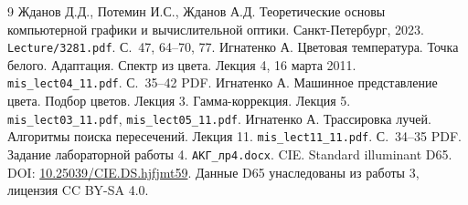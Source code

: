\documentclass[a4paper,12pt]{article}
\newcommand{\code}[1]{\nolinkurl{#1}}
\begin{document}
\begin{thebibliography}{9}
 Жданов Д.Д., Потемин И.С., Жданов А.Д. Теоретические основы компьютерной графики и вычислительной оптики. Санкт-Петербург, 2023. \code{Lecture/3281.pdf}. С.~47, 64--70, 77.
 Игнатенко А. Цветовая температура. Точка белого. Адаптация. Спектр из цвета. Лекция 4, 16 марта 2011. \code{mis_lect04_11.pdf}. С.~35--42 PDF.
 Игнатенко А. Машинное представление цвета. Подбор цветов. Лекция 3. Гамма-коррекция. Лекция 5. \code{mis_lect03_11.pdf}, \code{mis_lect05_11.pdf}.
 Игнатенко А. Трассировка лучей. Алгоритмы поиска пересечений. Лекция 11. \code{mis_lect11_11.pdf}. С.~34--35 PDF.
 Задание лабораторной работы 4. \code{АКГ_лр4.docx}.
 CIE. Standard illuminant D65. DOI: \href{https://doi.org/10.25039/CIE.DS.hjfjmt59}{10.25039/CIE.DS.hjfjmt59}. Данные D65 унаследованы из работы 3, лицензия CC BY-SA 4.0.
\end{thebibliography}
\end{document}
